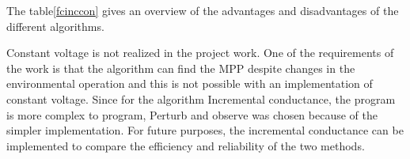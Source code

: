 The table\ref{fcinccon} gives an overview of the advantages and disadvantages of the different algorithms.

%		

Constant voltage is not realized in the project work. One of the requirements of the work is that the algorithm can find the MPP despite changes in the environmental operation and this is not possible with an implementation of constant voltage. Since for the algorithm Incremental conductance, the program is more complex to program, Perturb and observe was chosen because of the simpler implementation. For future purposes, the incremental conductance can be implemented to compare the efficiency and reliability of the two methods.


